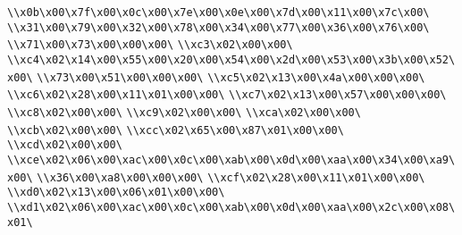 \verb|\\x0b\x00\x7f\x00\x0c\x00\x7e\x00\x0e\x00\x7d\x00\x11\x00\x7c\x00\|\newline
\verb|\\x31\x00\x79\x00\x32\x00\x78\x00\x34\x00\x77\x00\x36\x00\x76\x00\|\newline
\verb|\\x71\x00\x73\x00\x00\x00\|\newline
\verb|\\xc3\x02\x00\x00\|\newline
\verb|\\xc4\x02\x14\x00\x55\x00\x20\x00\x54\x00\x2d\x00\x53\x00\x3b\x00\x52\x00\|\newline
\verb|\\x73\x00\x51\x00\x00\x00\|\newline
\verb|\\xc5\x02\x13\x00\x4a\x00\x00\x00\|\newline
\verb|\\xc6\x02\x28\x00\x11\x01\x00\x00\|\newline
\verb|\\xc7\x02\x13\x00\x57\x00\x00\x00\|\newline
\verb|\\xc8\x02\x00\x00\|\newline
\verb|\\xc9\x02\x00\x00\|\newline
\verb|\\xca\x02\x00\x00\|\newline
\verb|\\xcb\x02\x00\x00\|\newline
\verb|\\xcc\x02\x65\x00\x87\x01\x00\x00\|\newline
\verb|\\xcd\x02\x00\x00\|\newline
\verb|\\xce\x02\x06\x00\xac\x00\x0c\x00\xab\x00\x0d\x00\xaa\x00\x34\x00\xa9\x00\|\newline
\verb|\\x36\x00\xa8\x00\x00\x00\|\newline
\verb|\\xcf\x02\x28\x00\x11\x01\x00\x00\|\newline
\verb|\\xd0\x02\x13\x00\x06\x01\x00\x00\|\newline
\verb|\\xd1\x02\x06\x00\xac\x00\x0c\x00\xab\x00\x0d\x00\xaa\x00\x2c\x00\x08\x01\|\newline
